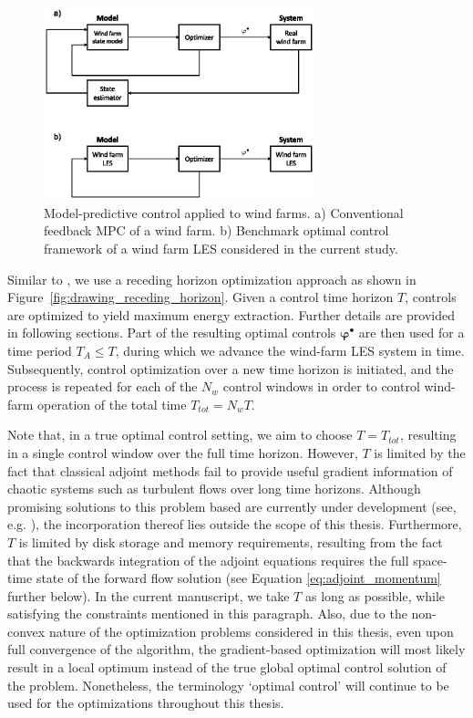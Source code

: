 \begin{figure}
	\centering
	\includegraphics[width=0.7\textwidth]{chapters/optimal_control_problem/figure1.eps}
	\caption{Model-predictive control applied to wind farms. a) Conventional feedback MPC of a wind farm. b) Benchmark optimal control framework of a wind farm LES considered in the current study.}\label{fig:block_diag}
\end{figure}

Similar to \cite{goit2015optimal}, we use a receding horizon optimization approach as shown in Figure~\ref{fig:drawing_receding_horizon}. Given a control time horizon $T$, controls are optimized to yield maximum energy extraction. Further details are provided in following sections. Part of the resulting optimal controls $\boldsymbol{\varphi}^{\bullet}$ are then used for a time period $T_A \leq T$, during which we advance the wind-farm LES system in time. Subsequently, control optimization over a new time horizon is initiated, and the process is repeated for each of the $N_w$ control windows in order to control wind-farm operation of the total time $T_{tot} = N_w T$. 

Note that, in a true optimal control setting, we aim to choose $T = T_{tot}$, resulting in a single control window over the full time horizon. However, $T$ is limited by the fact that classical adjoint methods fail to provide useful gradient information of chaotic systems such as turbulent flows over long time horizons. Although promising solutions to this problem based are currently under development (see, e.g. \citealp{wang2014least, chater2016simplified}), the incorporation thereof lies outside the scope of this thesis. Furthermore, $T$ is limited by disk storage and memory requirements, resulting from the fact that the backwards integration of the adjoint equations requires the full space-time state of the forward flow solution (see Equation \ref{eq:adjoint_momentum} further below). In the current manuscript, we take $T$ as long as possible, while satisfying the constraints mentioned in this paragraph. Also, due to the non-convex nature of the optimization problems considered in this thesis, even upon full convergence of the algorithm, the gradient-based optimization will most likely result in a local optimum instead of the true global optimal control solution of the problem. Nonetheless, the terminology `optimal control' will continue to be used for the optimizations throughout this thesis. 

